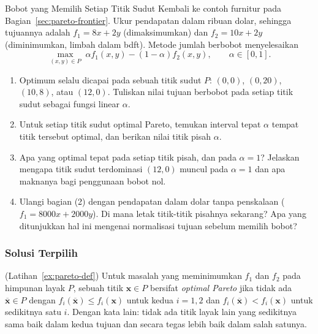 
\begin{ex}{Bobot yang Memilih Setiap Titik Sudut}{}
\label{ex:furniture-weights}
Kembali ke contoh furnitur pada Bagian~\ref{sec:pareto-frontier}. Ukur pendapatan dalam ribuan dolar, sehingga tujuannya adalah $f_1 = 8x + 2y$ (dimaksimumkan) dan $f_2 = 10x + 2y$ (diminimumkan, limbah dalam bdft). Metode jumlah berbobot menyelesaikan
\[
\max_{(x,y) \in P} \; \alpha f_1(x,y) - (1-\alpha) f_2(x,y), \qquad \alpha \in [0,1].
\]
\begin{enumerate}
\item Optimum selalu dicapai pada sebuah titik sudut $P$: $(0,0)$, $(0,20)$, $(10,8)$, atau $(12,0)$. Tuliskan nilai tujuan berbobot pada setiap titik sudut sebagai fungsi linear $\alpha$.
\item Untuk setiap titik sudut optimal Pareto, temukan interval tepat $\alpha$ tempat titik tersebut optimal, dan berikan nilai titik pisah $\alpha$.
\item Apa yang optimal tepat pada setiap titik pisah, dan pada $\alpha = 1$? Jelaskan mengapa titik sudut terdominasi $(12,0)$ muncul pada $\alpha = 1$ dan apa maknanya bagi penggunaan bobot nol.
\item Ulangi bagian (2) dengan pendapatan dalam dolar tanpa penskalaan ($f_1 = 8000x + 2000y$). Di mana letak titik-titik pisahnya sekarang? Apa yang ditunjukkan hal ini mengenai normalisasi tujuan sebelum memilih bobot?
\end{enumerate}
\end{ex}

\subsubsection*{Solusi Terpilih}

\begin{solution}(Latihan~\ref{ex:pareto-def})
Untuk masalah yang meminimumkan $f_1$ dan $f_2$ pada himpunan layak $P$, sebuah titik $\mathbf{x} \in P$ bersifat \emph{optimal Pareto} jika tidak ada $\overline{\mathbf{x}} \in P$ dengan $f_i(\overline{\mathbf{x}}) \leq f_i(\mathbf{x})$ untuk kedua $i = 1, 2$ dan $f_i(\overline{\mathbf{x}}) < f_i(\mathbf{x})$ untuk sedikitnya satu $i$. Dengan kata lain: tidak ada titik layak lain yang sedikitnya sama baik dalam kedua tujuan dan secara tegas lebih baik dalam salah satunya.
\end{solution}

